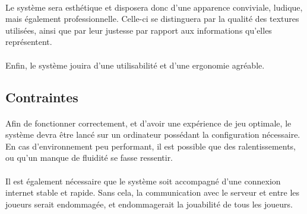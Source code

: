 \documentclass[a4paper,11pt]{report}
\begin{document}
\paragraph{}
Le système sera esthétique et disposera donc d’une apparence conviviale, ludique, mais également professionnelle.
Celle-ci se distinguera par la qualité des textures utilisées, ainsi que par leur justesse par rapport aux informations qu’elles représentent.
\paragraph{}
Enfin, le système jouira d’une utilisabilité et d’une ergonomie agréable.
\subsection{Contraintes}
\paragraph{}
Afin de fonctionner correctement, et d’avoir une expérience de jeu optimale, le système devra être lancé sur un ordinateur possédant la configuration nécessaire.
En cas d’environnement peu performant, il est possible que des ralentissements, ou qu’un manque de fluidité se fasse ressentir.
\paragraph{}
Il est également nécessaire que le système soit accompagné d’une connexion internet stable et rapide.
Sans cela, la communication avec le serveur et entre les joueurs serait endommagée, et endommagerait la jouabilité de tous les joueurs.
\end{document}
